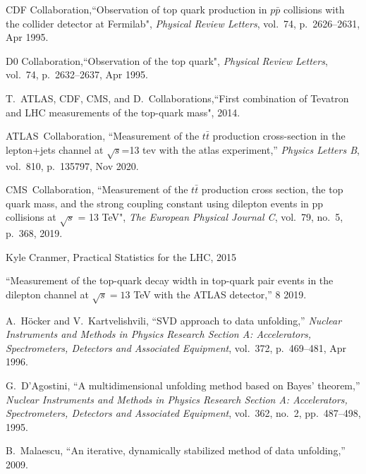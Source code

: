 \documentclass[12pt]{article}
\begin{document}
\begin{thebibliography}{99}



CDF Collaboration,``Observation of top quark production in $p\bar{p}$ collisions with the collider detector at Fermilab", {\em Physical Review Letters}, vol.~74, p.~2626–2631, Apr 1995.

D0 Collaboration,``Observation of the top quark", {\em Physical Review Letters}, vol.~74, p.~2632–2637, Apr 1995.

T.~ATLAS, CDF, CMS, and D.~Collaborations,``First combination of Tevatron and LHC measurements of the top-quark mass", 2014.

ATLAS~Collaboration, ``Measurement of the $t\bar{t}$ production cross-section in the lepton+jets channel at $\sqrt{s}$=13 tev with the atlas experiment,''
  {\em Physics Letters B}, vol.~810, p.~135797, Nov 2020.

CMS~Collaboration, ``Measurement of the $t\bar{t}$ production cross section, the top quark mass, and the strong coupling constant using dilepton events in pp collisions
  at $\sqrt{s}$ = 13 TeV", {\em The European
  Physical Journal C}, vol.~79, no.~5, p.~368, 2019.

Kyle Cranmer, Practical Statistics for the LHC, 2015

``{Measurement of the top-quark decay width in top-quark pair events in the
  dilepton channel at $\sqrt{s}=13$ TeV with the ATLAS detector},'' 8 2019.

A.~Höcker and V.~Kartvelishvili, ``SVD approach to data unfolding,'' {\em
  Nuclear Instruments and Methods in Physics Research Section A: Accelerators,
  Spectrometers, Detectors and Associated Equipment}, vol.~372, p.~469–481,
  Apr 1996.

G.~D'Agostini, ``A multidimensional unfolding method based on Bayes' theorem,''
  {\em Nuclear Instruments and Methods in Physics Research Section A:
  Accelerators, Spectrometers, Detectors and Associated Equipment}, vol.~362,
  no.~2, pp.~487--498, 1995.

B.~Malaescu, ``An iterative, dynamically stabilized method of data unfolding,''
  2009.


\end{thebibliography}
\end{document}
